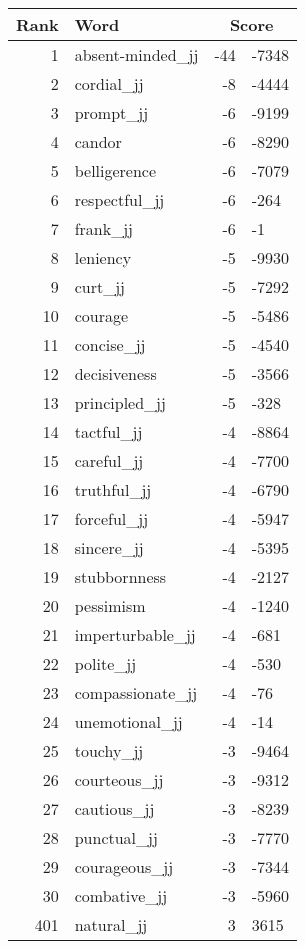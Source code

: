 \begin{longtable}[!htbp]{| rlr@{.}l |}
    \hline
    \textbf{Rank} & \textbf{Word} & \multicolumn{2}{c|}{\textbf{Score}} \\
    \hline
    \endhead
    1 & absent-minded\_jj & -44 & -7348 \\
    2 & cordial\_jj & -8 & -4444 \\
    3 & prompt\_jj & -6 & -9199 \\
    4 & candor & -6 & -8290 \\
    5 & belligerence & -6 & -7079 \\
    6 & respectful\_jj & -6 & -264 \\
    7 & frank\_jj & -6 & -1 \\
    8 & leniency & -5 & -9930 \\
    9 & curt\_jj & -5 & -7292 \\
    10 & courage & -5 & -5486 \\
    11 & concise\_jj & -5 & -4540 \\
    12 & decisiveness & -5 & -3566 \\
    13 & principled\_jj & -5 & -328 \\
    14 & tactful\_jj & -4 & -8864 \\
    15 & careful\_jj & -4 & -7700 \\
    16 & truthful\_jj & -4 & -6790 \\
    17 & forceful\_jj & -4 & -5947 \\
    18 & sincere\_jj & -4 & -5395 \\
    19 & stubbornness & -4 & -2127 \\
    20 & pessimism & -4 & -1240 \\
    21 & imperturbable\_jj & -4 & -681 \\
    22 & polite\_jj & -4 & -530 \\
    23 & compassionate\_jj & -4 & -76 \\
    24 & unemotional\_jj & -4 & -14 \\
    25 & touchy\_jj & -3 & -9464 \\
    26 & courteous\_jj & -3 & -9312 \\
    27 & cautious\_jj & -3 & -8239 \\
    28 & punctual\_jj & -3 & -7770 \\
    29 & courageous\_jj & -3 & -7344 \\
    30 & combative\_jj & -3 & -5960 \\
    401 & natural\_jj & 3 & 3615 \\

\end{longtable}
